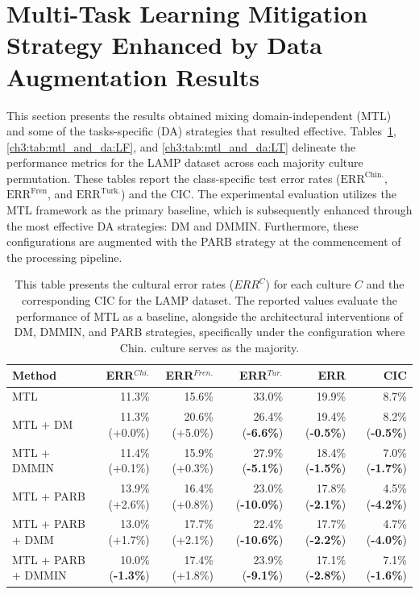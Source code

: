 \section{Multi-Task Learning Mitigation Strategy Enhanced by Data Augmentation Results}
\label{ch3:sec:mtl_and_da}
This section presents the results obtained mixing domain-independent (MTL) and some of the tasks-specific (DA) strategies that resulted effective.
Tables~\ref{ch3:tab:mtl_and_da:LC}, \ref{ch3:tab:mtl_and_da:LF}, and \ref{ch3:tab:mtl_and_da:LT} delineate the performance metrics for the LAMP dataset across each majority culture permutation. 
These tables report the class-specific test error rates ($\text{ERR}^{\text{Chin.}}$, $\text{ERR}^{\text{Fren}}$, and $\text{ERR}^{\text{Turk.}}$) and the CIC. 
The experimental evaluation utilizes the MTL framework as the primary baseline, which is subsequently enhanced through the most effective DA strategies: DM and DMMIN. 
Furthermore, these configurations are augmented with the PARB strategy at the commencement of the processing pipeline.
%
%
\begin{table} [H]
\centering
\scriptsize
\begin{tabular}{lrrrrr}
\toprule
\textbf{Method} & \textbf{ERR$^{Chi.}$} & \textbf{ERR$^{Fren.}$} & \textbf{ERR$^{Tur.}$} & \textbf{ERR} & \textbf{CIC} \\
\midrule
MTL          & 11.3\% & 15.6\% & 33.0\% & 19.9\% & 8.7\% \\
MTL + DM     & 11.3\% (+0.0\%) & 20.6\% (+5.0\%) & 26.4\% (\textbf{-6.6\%}) & 19.4\% (\textbf{-0.5\%}) & 8.2\% (\textbf{-0.5\%}) \\
MTL +  DMMIN & 11.4\% (+0.1\%) & 15.9\% (+0.3\%) & 27.9\% (\textbf{-5.1\%}) & 18.4\% (\textbf{-1.5\%}) & 7.0\% (\textbf{-1.7\%}) \\
\hline
MTL +  PARB    & 13.9\% (+2.6\%) & 16.4\% (+0.8\%) & 23.0\% (\textbf{-10.0\%}) & 17.8\% (\textbf{-2.1\%}) & 4.5\% (\textbf{-4.2\%}) \\
MTL + PARB + DMM & 13.0\% (+1.7\%) & 17.7\% (+2.1\%) & 22.4\% (\textbf{-10.6\%}) & 17.7\% (\textbf{-2.2\%}) & 4.7\% (\textbf{-4.0\%}) \\
MTL + PARB + DMMIN & 10.0\% (\textbf{-1.3\%}) & 17.4\% (+1.8\%) & 23.9\% (\textbf{-9.1\%}) & 17.1\% (\textbf{-2.8\%}) & 7.1\% (\textbf{-1.6\%}) \\
\bottomrule
\end{tabular}
\caption{This table presents the cultural error rates ($ERR^C$) for each culture $C$ and the corresponding CIC for the LAMP dataset. The reported values evaluate the performance of MTL as a baseline, alongside the architectural interventions of DM, DMMIN, and PARB strategies, specifically under the configuration where Chin. culture serves as the majority.}
\label{ch3:tab:mtl_and_da:LC}
\end{table}
